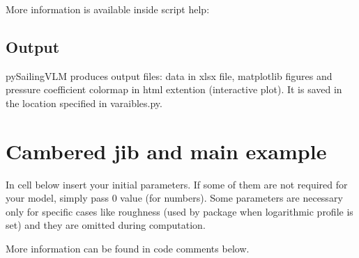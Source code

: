 \documentclass[letterpaper,10pt,english]{jupyterBook}
\begin{document}
\sphinxAtStartPar
More information is available inside script help:

\begin{sphinxVerbatim}[commandchars=\\\{\}]
 
\end{sphinxVerbatim}


\subsection{Output}
\label{\detokenize{chapters/usage/usage:output}}
\sphinxAtStartPar
pySailingVLM produces output files: data in xlsx file, matplotlib figures and pressure coefficient colormap in html extention (interactive plot). It is saved in the location specified in varaibles.py.

\sphinxstepscope


\section{Cambered jib and main example}
\label{\detokenize{chapters/examples/sailingvlm_example:cambered-jib-and-main-example}}\label{\detokenize{chapters/examples/sailingvlm_example::doc}}
\sphinxAtStartPar
In cell below insert your initial parameters. If some of them are not required for your model, simply pass 0 value (for numbers).
Some parameters are necessary only for specific cases like roughness (used by package when logarithmic profile is set) and they are omitted during computation.



\sphinxAtStartPar
More information can be found in code comments below.
\end{document}
